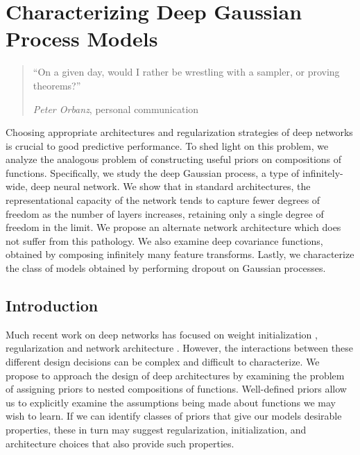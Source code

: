 
\inbpdocument


\chapter{Characterizing Deep Gaussian Process Models}
\label{ch:deep-limits}

\begin{quotation}
``On a given day, would I rather be wrestling with a sampler, or proving theorems?''

\hspace*{\fill} \emph{Peter Orbanz}, personal communication
\end{quotation}




Choosing appropriate architectures and regularization strategies of deep networks is crucial to good predictive performance.  To shed light on this problem, we analyze the analogous problem of constructing useful priors on compositions of functions.  Specifically, we study the deep Gaussian process, a type of infinitely-wide, deep neural network.  We show that in standard architectures, the representational capacity of the network tends to capture fewer degrees of freedom as the number of layers increases, retaining only a single degree of freedom in the limit.  We propose an alternate network architecture which does not suffer from this pathology.  We also examine deep covariance functions, obtained by composing infinitely many feature transforms.  Lastly, we characterize the class of models obtained by performing dropout on Gaussian processes.






\section{Introduction}

Much recent work on deep networks has focused on weight initialization \citep{martens2010deep}, regularization \citep{lee2007sparse} and network architecture \citep{gens2013learning}.
However, the interactions between these different design decisions can be complex and difficult to characterize.
We propose to approach the design of deep architectures by examining the problem of assigning priors to nested compositions of functions.
Well-defined priors allow us to explicitly examine the assumptions being made about functions we may wish to learn.
If we can identify classes of priors that give our models desirable properties, these in turn may suggest regularization, initialization, and architecture choices that also provide such properties.

